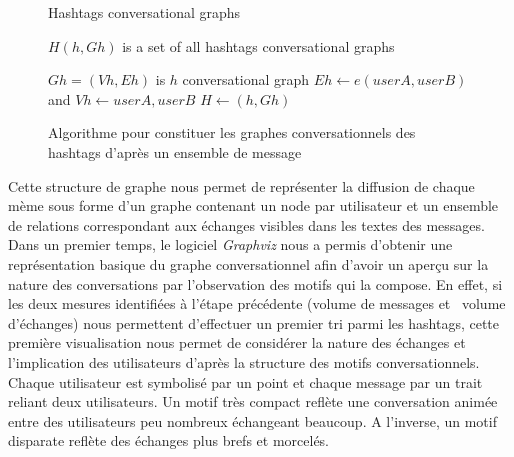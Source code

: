 \begin{figure}
    
    \label{algo:hashtags-graph}
    \begin{algorithm}[H]
        \caption{Hashtags conversational graphs}
        \begin{algorithmic}
            \State $H(h,Gh)$ is a set of all hashtags conversational graphs


                        \State $Gh=(Vh,Eh)$ is $h$ conversational graph
                            \State $Eh \gets e(userA,userB)$ and $Vh \gets userA,userB $
                        \EndIf
                        \State $H \gets (h,Gh)$ 
                    \EndIf
                \EndFor
            \EndFunction
        \end{algorithmic}
    \end{algorithm}
    \caption{Algorithme pour constituer les graphes conversationnels des hashtags d'après un ensemble de message}
\end{figure}

Cette structure de graphe nous permet de représenter la diffusion de chaque mème sous forme d{\textquoteright}un graphe contenant un node par utilisateur et un ensemble de relations correspondant aux échanges visibles dans les textes des messages. Dans un premier temps, le logiciel \textit{Graphviz }nous a permis d{\textquoteright}obtenir une représentation basique du graphe conversationnel afin d{\textquoteright}avoir un aper\c{c}u sur la nature des conversations par l{\textquoteright}observation des motifs qui la compose. En effet, si les deux mesures identifiées à l{\textquoteright}étape précédente (volume de messages et \ volume d{\textquoteright}échanges) nous permettent d{\textquoteright}effectuer un premier tri parmi les hashtags, cette première visualisation nous permet de considérer la nature des échanges et l{\textquoteright}implication des utilisateurs d{\textquoteright}après la structure des motifs conversationnels. Chaque utilisateur est symbolisé par un point et chaque message par un trait reliant deux utilisateurs. Un motif très compact reflète une conversation animée entre des utilisateurs peu nombreux échangeant beaucoup. A l{\textquoteright}inverse, un motif disparate reflète des échanges plus brefs et morcelés.

